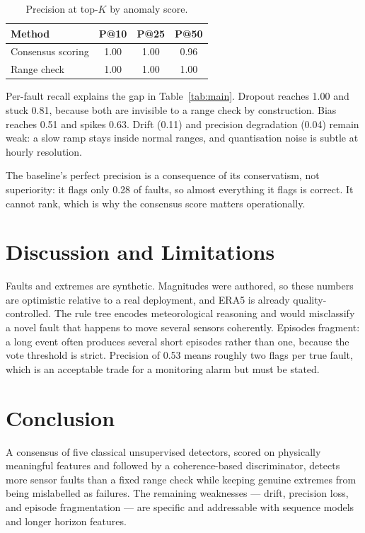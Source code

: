 \documentclass[conference]{IEEEtran}
\begin{document}
\begin{table}[ht]
\centering
\caption{Precision at top-$K$ by anomaly score.}
\label{tab:precision}
\begin{tabular}{lccc}
\toprule
Method & P@10 & P@25 & P@50 \\
\midrule
Consensus scoring & 1.00 & 1.00 & 0.96 \\
Range check & 1.00 & 1.00 & 1.00 \\
\bottomrule
\end{tabular}
\end{table}

Per-fault recall explains the gap in Table~\ref{tab:main}. Dropout reaches 1.00 and stuck 0.81,
because both are invisible to a range check by construction. Bias reaches 0.51 and spikes 0.63. Drift
(0.11) and precision degradation (0.04) remain weak: a slow ramp stays inside normal ranges, and
quantisation noise is subtle at hourly resolution.

The baseline's perfect precision is a consequence of its conservatism, not superiority: it flags only
0.28 of faults, so almost everything it flags is correct. It cannot rank, which is why the consensus
score matters operationally.

\section{Discussion and Limitations}
Faults and extremes are synthetic. Magnitudes were authored, so these numbers are optimistic relative
to a real deployment, and ERA5 is already quality-controlled. The rule tree encodes meteorological
reasoning and would misclassify a novel fault that happens to move several sensors coherently.
Episodes fragment: a long event often produces several short episodes rather than one, because the
vote threshold is strict. Precision of 0.53 means roughly two flags per true fault, which is an
acceptable trade for a monitoring alarm but must be stated.

\section{Conclusion}
A consensus of five classical unsupervised detectors, scored on physically meaningful features and
followed by a coherence-based discriminator, detects more sensor faults than a fixed range check
while keeping genuine extremes from being mislabelled as failures. The remaining weaknesses --- drift,
precision loss, and episode fragmentation --- are specific and addressable with sequence models and
longer horizon features.
\end{document}
